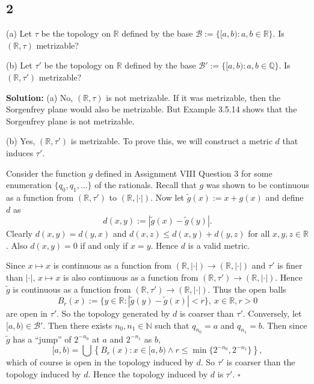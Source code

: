 \documentclass[12pt]{article}
\newcounter{ProofCounter}
\newenvironment{Solution}{\stepcounter{ProofCounter}\textbf{Solution:}}{\hfill$\square$}
\begin{document}
\subsection*{2}
\begin{tcolorbox}
  (a) Let $\tau$ be the topology on $\mathbb{R}$ defined by the base $\mathcal{B} := \{[a,b) : a,b \in \mathbb{R}\}$. Is $(\mathbb{R}, \tau)$
  metrizable?

  (b) Let $\tau'$ be the topology on $\mathbb{R}$ defined by the base $\mathcal{B}' := \{[a,b) : a, b \in \mathbb{Q}\}$. Is $(\mathbb{R}, \tau')$
  metrizable?
\end{tcolorbox}
\begin{Solution}
  (a) No, $(\mathbb{R}, \tau)$ is not metrizable. If it was metrizable, then the Sorgenfrey plane would also be metrizable. But Example 3.5.14 shows
  that the Sorgenfrey plane is not metrizable.

  (b) Yes, $(\mathbb{R}, \tau')$ is metrizable. To prove this, we will construct a metric $d$ that induces $\tau'$.

  Consider the function $g$ defined in Assignment VIII Question 3 for some enumeration $\{q_0, q_1, \dots \}$ of the rationals. 
  Recall that $g$ was shown to be continuous as a function from $(\mathbb{R}, \tau')$ to
  $(\mathbb{R}, |\cdot|)$. Now let $\tilde{g}(x) := x + g(x)$ and define $d$ as 
  \[
    d(x,y) := |\tilde{g}(x) - \tilde{g}(y)|.
  \]
  Clearly $d(x,y) = d(y,x)$ and $d(x,z) \leq d(x,y) + d(y,z)$ for all $x, y, z \in \mathbb{R}$. Also $d(x, y) = 0$ if and only if $x = y$.
  Hence $d$ is a valid metric.

  Since $x \mapsto x$ is continuous as a function from  $(\mathbb{R}, |\cdot|)
  \rightarrow (\mathbb{R}, |\cdot|)$ and $\tau'$ is finer than
  $|\cdot|$, $x \mapsto x$ is also continuous as a function from $(\mathbb{R}, \tau') \rightarrow (\mathbb{R}, |\cdot|)$.
  Hence $\tilde{g}$ is continuous as a function from $(\mathbb{R}, \tau') \rightarrow (\mathbb{R}, |\cdot|)$. Thus the open balls
  \[
    B_r(x) := \{ y \in \mathbb{R} : |\tilde{g}(y) - \tilde{g}(x)| < r \}, \ x \in \mathbb{R}, r > 0
  \]
  are open in $\tau'$. So the topology generated by $d$ is coarser than $\tau'$. Conversely, let $[a,b) \in \mathcal{B}'$. Then there exists $n_0, n_1 \in
  \mathbb{N}$ such that $q_{n_0} = a$ and $q_{n_1} = b$. Then since $\tilde{g}$ has a ``jump'' of $2^{-{n_0}}$ at $a$ and $2^{-n_1}$ as $b$,
  \[
    [a,b) = \bigcup \left\{ B_r(x) : x \in [a,b) \wedge r \leq \min\{ 2^{-n_0}, 2^{-n_1}\} \right\},
  \]
  which of course is open in the topology induced by $d$. So $\tau'$ is coarser than the topology induced by $d$.
  Hence the topology induced by $d$ is $\tau'$.
\end{Solution}
\end{document}

